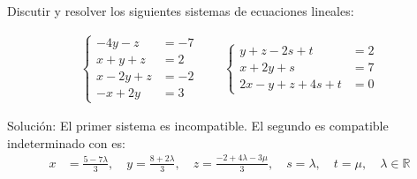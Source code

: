 \begin{ejercicio}Discutir y resolver los siguientes sistemas de ecuaciones lineales:

	\begin{align}
		\begin{cases}
			-4y - z    & = -7 \\
			x + y + z  & = 2  \\
			x - 2y + z & = -2 \\
			-x + 2y    & = 3
		\end{cases} \qquad
		\begin{cases}
			y + z - 2s + t      & = 2 \\
			x + 2y + s          & = 7 \\
			2x - y + z + 4s + t & = 0
		\end{cases}
	\end{align}

	Solución: El primer sistema es incompatible. El segundo es compatible indeterminado con es:
	\begin{align}
		x & = \frac{5 - 7\lambda}{3}, \quad y = \frac{8 + 2\lambda}{3}, \quad z = \frac{-2 + 4\lambda - 3\mu}{3}, \quad s = \lambda, \quad t = \mu, \quad \lambda \in \mathbb{R}
	\end{align}

\end{ejercicio}
